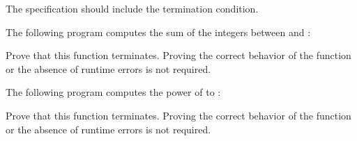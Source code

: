 The specification should include the termination condition.




The following program computes the sum of the integers between 
and :




Prove that this function terminates. Proving the correct behavior of the
function or the absence of runtime errors is not required.




The following program computes the power of  to :




Prove that this function terminates. Proving the correct behavior of the
function or the absence of runtime errors is not required.
